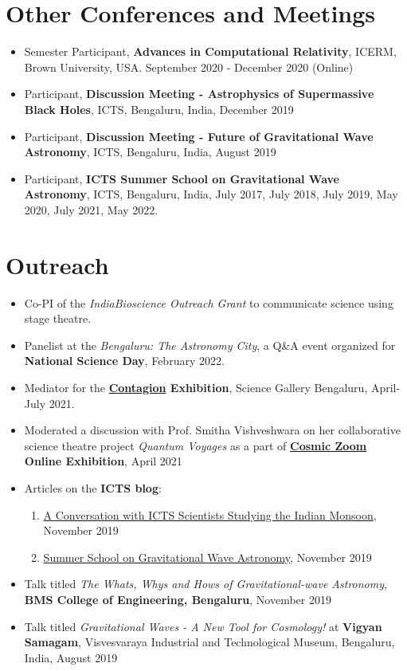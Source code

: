 \documentclass[11pt, margin, centered, letterpaper]{res}
\begin{document}
\begin{resume}
\section{Other Conferences and Meetings}
\begin{itemize}[leftmargin=*]
	\item Semester Participant, \textbf{Advances in Computational Relativity}, ICERM, Brown University, USA. September 2020 - December 2020 (Online)
	\item	Participant, \textbf{Discussion Meeting - Astrophysics of Supermassive Black Holes}, ICTS, Bengaluru, India, December 2019
	\item Participant, \textbf{Discussion Meeting - Future of Gravitational Wave Astronomy}, ICTS, Bengaluru, India, August 2019
	\item Participant, \textbf{ICTS Summer School on Gravitational Wave Astronomy}, ICTS, Bengaluru, India, July 2017, July 2018, July 2019, May 2020, July 2021, May 2022.

\end{itemize}
\section{Outreach}
\begin{itemize}[leftmargin=*]
	\item Co-PI of the \textit{IndiaBioscience Outreach Grant} to communicate science using stage theatre.
	\item Panelist at the \textit{Bengaluru: The Astronomy City}, a Q\&A event organized for \textbf{National Science Day}, February 2022.
	\item Mediator for the \textbf{\href{https://bengaluru.sciencegallery.com/contagion-archive}{Contagion} Exhibition}, Science Gallery Bengaluru, April-July 2021.
	\item Moderated a discussion with Prof. Smitha Vishveshwara on her collaborative science theatre project \textit{Quantum Voyages} as a part of \textbf{\href{https://cosmic-zoom.in/}{Cosmic Zoom} Online Exhibition}, April 2021
	\item Articles on the \textbf{ICTS blog}:
	\begin{enumerate}
		\item \href{https://blog.icts.res.in/blog/conversation-icts-scientists-studying-indian-monsoon}{A Conversation with ICTS Scientists Studying the Indian Monsoon}, November 2019
		\item \href{https://blog.icts.res.in/blog/summer-school-gravitational-wave-astronomy}{Summer School on Gravitational Wave Astronomy}, November 2019
	\end{enumerate}	
	\item Talk titled \textit{The Whats, Whys and Hows of Gravitational-wave Astronomy}, \textbf{BMS College of Engineering, Bengaluru}, November 2019
	\item Talk titled \textit{Gravitational Waves - A New Tool for Cosmology!} at \textbf{Vigyan Samagam}, Visvesvaraya Industrial and Technological Museum, Bengaluru, India, August 2019


\end{itemize}
\end{resume}
\end{document}
